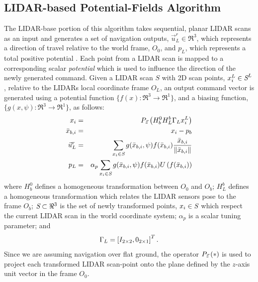 		\subsection{LIDAR-based Potential-Fields Algorithm}
			The LIDAR-base portion of this algorithm takes sequential, planar LIDAR scans as an input and generates a set of navigation outputs, $\vec{u}^{r}_{L} \in \Re^{3}$, which represents a direction of travel relative to the world frame, $O_{0}$, and $p_{L}$, which represents a total positive potential . Each point from a LIDAR scan is mapped to a corresponding scalar \emph{potential} which is used to influence the direction of the newly generated command. Given a LIDAR scan $S$ with 2D scan points, $x_{i}^{L}\in\emph{S}^{L}$, relative to the LIDARs local coordinate frame $O_{L}$, an output command vector is generated using a potential function $\{ f(x) : \Re^{3}\rightarrow \Re^{1} \}$, and a biasing function, $\{ g(x,\psi) : \Re^{3}\rightarrow \Re^{1} \}$, as follows:
				\begin{eqnarray}
				x_{i}  &=& P_{ \vec{z} } \left( H_{b}^{0} H_{L}^{b} \Gamma_{L} x_{i}^{L} \right) \nonumber\\
				\bar{x}_{b,i} &=&  x_{i}-p_{b} \nonumber \\
				\vec{u}^{r}_{L} &=&  { \sum_{x_{i} \in \emph{S}} g( \bar{x}_{b,i},\psi)  f( \bar{x}_{b,i} ) \frac{\bar{x}_{b,i}}{\left\lVert\bar{x}_{b,i}\right\rVert} } \nonumber \\
				p_{L} & = & \alpha_{p}\sum_{x_{i} \in \emph{S}} g( \bar{x}_{b,i},\psi)  f( \bar{x}_{b,i} ) U\left(f( \bar{x}_{b,i} )\right)
				\end{eqnarray}
			where $H_{b}^{0}$ defines a homogeneous transformation between $O_{0}$ and $O_{b}$; $H_{L}^{b}$ defines a homogeneous transformation which relates the LIDAR sensors pose to the frame $O_{b}$; $\emph{S}\subset \Re^{3}$ is the set of newly transformed points, $x_{i} \in \emph{S}$ which respect the current LIDAR scan in the world coordinate system; $\alpha_{p}$ is a scalar tuning parameter; and 
				\begin{equation*}
					\Gamma_{L} = \left[ I_{2\times2}, 0_{2\times1} \right]^{T}.
				\end{equation*}
			Since we are assuming navigation over flat ground, the operator $P_{ \vec{z} }\left(*\right)$ is used to project each transformed LIDAR scan-point onto the plane defined by the $z$-axis unit vector in the frame $O_{0}$.

